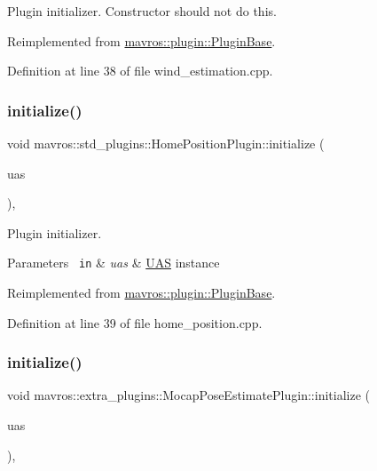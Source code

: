 Plugin initializer. Constructor should not do this. 

Reimplemented from \mbox{\hyperlink{group__plugin_gad5313a41da4d26acbbabf008cdc21e82}{mavros\+::plugin\+::\+Plugin\+Base}}.



Definition at line 38 of file wind\+\_\+estimation.\+cpp.

\mbox{\label{group__plugin_ga79d40eaf420dfce7a44db82cc6b46331}} 
\subsubsection{\texorpdfstring{initialize()}{initialize()}\hspace{0.1cm}{\footnotesize\ttfamily [16/41]}}
{\footnotesize\ttfamily void mavros\+::std\+\_\+plugins\+::\+Home\+Position\+Plugin\+::initialize (\begin{DoxyParamCaption}\item[{\mbox{\hyperlink{classmavros_1_1UAS}{U\+AS}} \&}]{uas }\end{DoxyParamCaption})\hspace{0.3cm}{\ttfamily [inline]}, {\ttfamily [virtual]}}



Plugin initializer. 


\begin{DoxyParams}[1]{Parameters}
\mbox{\texttt{ in}}  & {\em uas} & {\ttfamily \mbox{\hyperlink{classmavros_1_1UAS}{U\+AS}}} instance \\
\hline
\end{DoxyParams}


Reimplemented from \mbox{\hyperlink{group__plugin_gad5313a41da4d26acbbabf008cdc21e82}{mavros\+::plugin\+::\+Plugin\+Base}}.



Definition at line 39 of file home\+\_\+position.\+cpp.

\mbox{\label{group__plugin_ga28f24bffc57ef681f8c61dfbcc53478c}} 
\subsubsection{\texorpdfstring{initialize()}{initialize()}\hspace{0.1cm}{\footnotesize\ttfamily [17/41]}}
{\footnotesize\ttfamily void mavros\+::extra\+\_\+plugins\+::\+Mocap\+Pose\+Estimate\+Plugin\+::initialize (\begin{DoxyParamCaption}\item[{\mbox{\hyperlink{classmavros_1_1UAS}{U\+AS}} \&}]{uas }\end{DoxyParamCaption})\hspace{0.3cm}{\ttfamily [inline]}, {\ttfamily [virtual]}}



